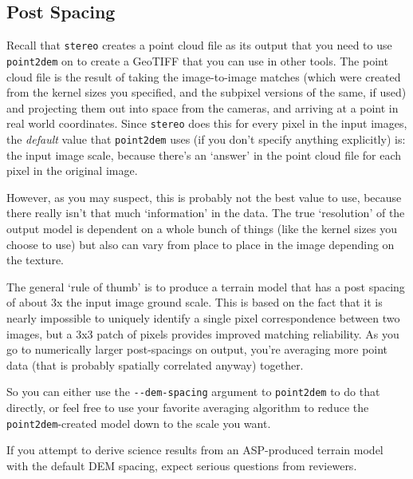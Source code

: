 \subsection{Post Spacing}

Recall that \texttt{stereo} creates a point cloud file as its output
that you need to use \texttt{point2dem} on to create a GeoTIFF that
you can use in other tools.  The point cloud file is the result of
taking the image-to-image matches (which were created from the
kernel sizes you specified, and the subpixel versions of the same,
if used) and projecting them out into space from the cameras, and
arriving at a point in real world coordinates.  Since \texttt{stereo} does
this for every pixel in the input images, the \emph{default} value that
\texttt{point2dem} uses (if you don't specify anything explicitly) is: the
input image scale, because there's an `answer' in the point cloud
file for each pixel in the original image.

However, as you may suspect, this is probably not the best value to
use, because there really isn't that much `information' in the data.
The true `resolution' of the output model is dependent on a whole
bunch of things (like the kernel sizes you choose to use) but also can
vary from place to place in the image depending on the texture.

The general `rule of thumb' is to produce a terrain model that has a
post spacing of about 3x the input image ground scale.  This is based
on the fact that it is nearly impossible to uniquely identify a single
pixel correspondence between two images, but a 3x3 patch of pixels
provides improved matching reliability.  As you go to numerically
larger post-spacings on output, you're averaging more point data (that
is probably spatially correlated anyway) together.

So you can either use the \texttt{-\/-dem-spacing} argument to
\texttt{point2dem} to do that directly, or feel free to use your
favorite averaging algorithm to reduce the \texttt{point2dem}-created
model down to the scale you want.

If you attempt to derive science results from an ASP-produced terrain model
with the default DEM spacing, expect serious questions from reviewers.


